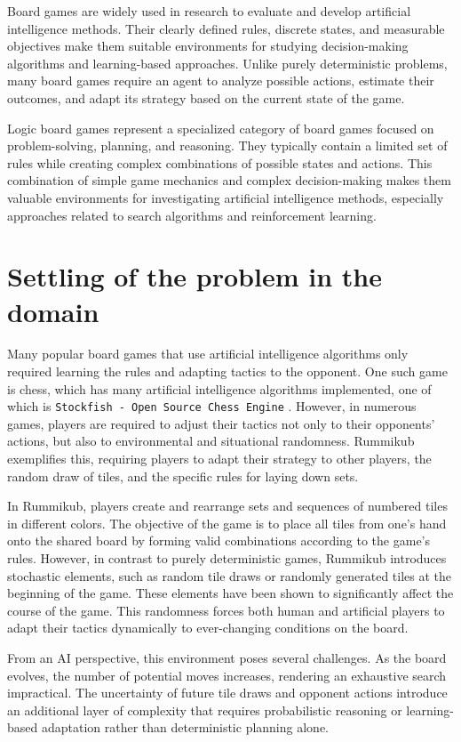 Board games are widely used in research to evaluate and develop artificial intelligence methods. Their clearly defined rules, discrete states, and measurable objectives make them suitable environments for studying decision-making algorithms and learning-based approaches. Unlike purely deterministic problems, many board games require an agent to analyze possible actions, estimate their outcomes, and adapt its strategy based on the current state of the game.

Logic board games represent a specialized category of board games focused on problem-solving, planning, and reasoning. They typically contain a limited set of rules while creating complex combinations of possible states and actions. This combination of simple game mechanics and complex decision-making makes them valuable environments for investigating artificial intelligence methods, especially approaches related to search algorithms and reinforcement learning.


\section{Settling of the problem in the domain}
Many popular board games that use artificial intelligence algorithms only required learning the rules and adapting tactics to the opponent. One such game is chess, which has many artificial intelligence algorithms implemented, one of which is \texttt{Stockfish - Open Source Chess Engine} \cite{bib:chess_online}. 
However, in numerous games, players are required to adjust their tactics not only to their opponents' actions, but also to environmental and situational randomness.
Rummikub exemplifies this, requiring players to adapt their strategy to other players, the random draw of tiles, and the specific rules for laying down sets.

In Rummikub, players create and rearrange sets and sequences of numbered tiles in different colors. The objective of the game is to place all tiles from one's hand onto the shared board by forming valid combinations according to the game's rules. However, in contrast to purely deterministic games, Rummikub introduces stochastic elements, such as random tile draws or randomly generated tiles at the beginning of the game. These elements have been shown to significantly affect the course of the game. This randomness forces both human and artificial players to adapt their tactics dynamically to ever-changing conditions on the board.

From an AI perspective, this environment poses several challenges. As the board evolves, the number of potential moves increases, rendering an exhaustive search impractical. The uncertainty of future tile draws and opponent actions introduce an additional layer of complexity that requires probabilistic reasoning or learning-based adaptation rather than deterministic planning alone.

